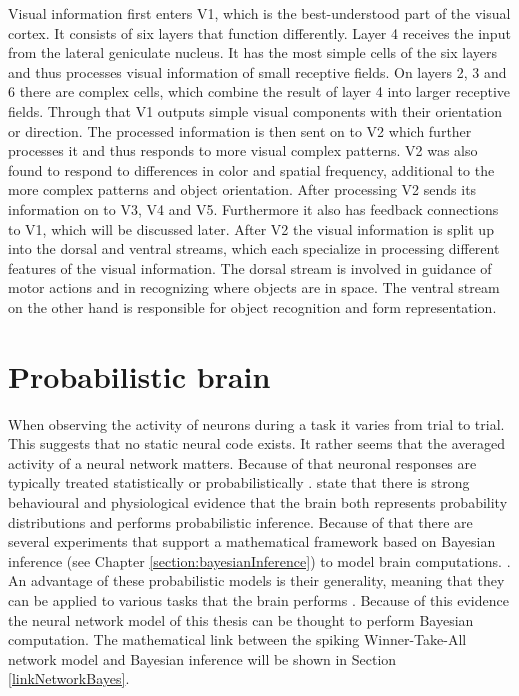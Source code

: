 Visual information first enters V1, which is the best-understood part of the visual cortex. It consists of six layers that function differently. Layer 4 receives the input from the lateral geniculate nucleus. It has the most simple cells of the six layers and thus processes visual information of small receptive fields. On layers 2, 3 and 6 there are complex cells, which combine the result of layer 4 into larger receptive fields. Through that V1 outputs simple visual components with their orientation or direction. The processed information is then sent on to V2 which further processes it and thus responds to more visual complex patterns. V2 was also found to respond to differences in color and spatial frequency, additional to the more complex patterns and object orientation. After processing V2 sends its information on to V3, V4 and V5. Furthermore it also has feedback connections to V1, which will be discussed later. After V2 the visual information is split up into the dorsal and ventral streams, which each specialize in processing different features of the visual information. The dorsal stream is involved in guidance of motor actions and in recognizing where objects are in space. The ventral stream on the other hand is responsible for object recognition and form representation.
\citep{visualCortexBook}

\section{Probabilistic brain}
\label{sec:probabilisticBrain}

When observing the activity of neurons during a task it varies from trial to trial. This suggests that no static neural code exists. It rather seems that the averaged activity of a neural network matters. Because of that neuronal responses are typically treated statistically or probabilistically \citep{SpikingNeuronModelsBook}.  \citet{probabilisticBrain} state that there is strong behavioural and physiological evidence that the brain both represents probability distributions and performs probabilistic inference. Because of that there are several experiments that support a mathematical framework based on Bayesian inference (see Chapter \ref{section:bayesianInference}) to model brain computations. \citep{neuralSubstrate, HierachicalBayesVisualCortex, anatomyOfInference, neuralImplementationOfBayesionInferenceSensoryMotor}. An advantage of these probabilistic models is their generality, meaning that they can be applied to various tasks that the brain performs \citep{probabilisticBrain}. Because of this evidence the neural network model of this thesis can be thought to perform Bayesian computation. The mathematical link between the spiking Winner-Take-All network model and Bayesian inference will be shown in Section \ref{linkNetworkBayes}.

